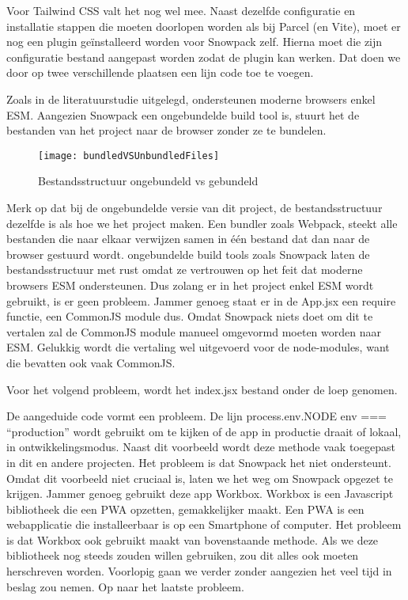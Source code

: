 Voor Tailwind CSS valt het nog wel mee. Naast dezelfde configuratie en installatie stappen die moeten doorlopen worden als bij Parcel (en Vite), moet er nog een plugin geïnstalleerd worden voor Snowpack zelf. Hierna moet die zijn configuratie bestand aangepast worden zodat de plugin kan werken. Dat doen we door op twee verschillende plaatsen een lijn code toe te voegen.

Zoals in de literatuurstudie uitgelegd, ondersteunen moderne browsers enkel ESM. Aangezien Snowpack een ongebundelde build tool is, stuurt het de bestanden van het project naar de browser zonder ze te bundelen.

\begin{figure}[h]
   \texttt{[image: bundledVSUnbundledFiles]}
       \centering
       \caption{Bestandsstructuur ongebundeld vs gebundeld}
 \end{figure}

Merk op dat bij de ongebundelde versie van dit project, de bestandsstructuur dezelfde is als hoe we het project maken. Een bundler zoals Webpack, steekt alle bestanden die naar elkaar verwijzen samen in één bestand dat dan naar de browser gestuurd wordt. ongebundelde build tools zoals Snowpack laten de bestandsstructuur met rust omdat ze vertrouwen op het feit dat moderne browsers ESM ondersteunen. Dus zolang er in het project enkel ESM wordt gebruikt, is er geen probleem. Jammer genoeg staat er in de App.jsx een require functie, een CommonJS module dus. Omdat Snowpack niets doet om dit te vertalen zal de CommonJS module manueel omgevormd moeten worden naar ESM. Gelukkig wordt die vertaling wel uitgevoerd voor de node-modules, want die bevatten ook vaak CommonJS.

Voor het volgend probleem, wordt het index.jsx bestand onder de loep genomen.



De aangeduide code vormt een probleem. De lijn process.env.NODE env === “production” wordt gebruikt om te kijken of de app in productie draait of lokaal, in ontwikkelingsmodus. Naast dit voorbeeld wordt deze methode vaak toegepast in dit en andere projecten. Het probleem is dat Snowpack het niet ondersteunt. Omdat dit voorbeeld niet cruciaal is, laten we het weg om Snowpack opgezet te krijgen. Jammer genoeg gebruikt deze app Workbox. Workbox is een Javascript bibliotheek die een PWA opzetten, gemakkelijker maakt. Een PWA is een webapplicatie die installeerbaar is op een Smartphone of computer. Het probleem is dat Workbox ook gebruikt maakt van bovenstaande methode. Als we deze bibliotheek nog steeds zouden willen gebruiken, zou dit alles ook moeten herschreven worden. Voorlopig gaan we verder zonder aangezien het veel tijd in beslag zou nemen. Op naar het laatste probleem.

